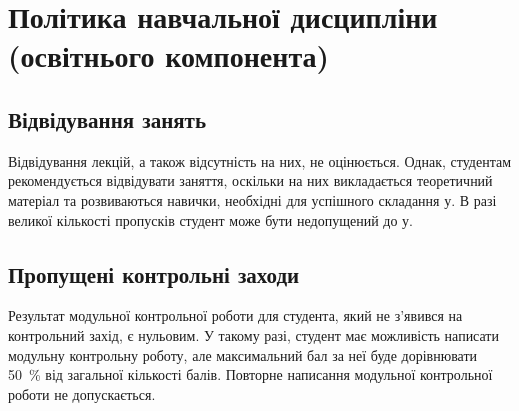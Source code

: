 \documentclass{Syllabus}
\begin{document}
\section{Політика навчальної дисципліни (освітнього компонента)}


\subsection*{Відвідування занять}
Відвідування лекцій, а також відсутність на них, не оцінюється. Однак, студентам рекомендується відвідувати заняття, оскільки на них викладається теоретичний матеріал та розвиваються навички, необхідні для успішного складання \control у. В разі великої кількості пропусків студент може бути недопущений до \control у.

\subsection*{Пропущені контрольні заходи}

Результат модульної контрольної роботи для студента, який не з’явився на контрольний захід, є нульовим. У такому разі, студент має можливість написати модульну контрольну роботу, але максимальний бал за неї буде дорівнювати 50~\% від загальної кількості балів. Повторне написання модульної контрольної роботи не допускається.
\end{document}
